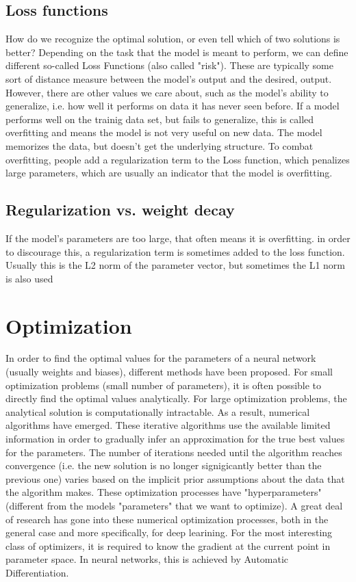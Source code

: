 \documentclass[twoside,12pt,a4paper]{report}
\begin{document}
\subsection{Loss functions}
How do we recognize the optimal solution, or even tell which of two solutions is better?
Depending on the task that the model is meant to perform, we can define different so-called Loss Functions (also called "risk"). These are typically some sort of distance measure between the model's output and the desired, output.
However, there are other values we care about, such as the model's ability to generalize, i.e. how well it performs on data it has never seen before. If a model performs well on the trainig data set, but fails to generalize, this is called overfitting and means the model is not very useful on new data. The model memorizes the data, but doesn't get the underlying structure. To combat overfitting, people add a regularization term to the Loss function, which penalizes large parameters, which are usually an indicator that the model is overfitting.

\subsection{Regularization vs. weight decay}
If the model's parameters are too large, that often means it is overfitting. in order to discourage this, a regularization term is sometimes added to the loss function. Usually this is the L2 norm of the parameter vector, but sometimes the L1 norm is also used

\section{Optimization}
In order to find the optimal values for the parameters of a neural network (usually weights and biases), different methods have been proposed. For small optimization problems (small number of parameters), it is often possible to directly find the optimal values analytically. For large optimization problems, the analytical solution is computationally intractable. As a result, numerical algorithms have emerged. These iterative algorithms use the available limited information in order to gradually infer an approximation for the true best values for the parameters. The number of iterations needed until the algorithm reaches convergence (i.e. the new solution is no longer signigicantly better than the previous one) varies based on the implicit prior assumptions about the data that the algorithm makes. These optimization processes have "hyperparameters" (different from the models "parameters" that we want to optimize). A great deal of research has gone into these numerical optimization processes, both in the general case and more specifically, for deep learining.
For the most interesting class of optimizers, it is required to know the gradient at the current point in parameter space. In neural networks, this is achieved by Automatic Differentiation.
\end{document}
